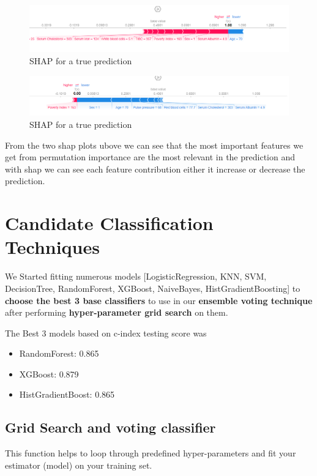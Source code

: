\documentclass[5 pt]{article}
\begin{document}
    \begin{figure}[h]
	\centering
	\includegraphics[width=1\textwidth, height =.15\textheight]{shap.png}
	\caption{SHAP for a true prediction}
	\end{figure}

    \begin{figure}[h]
	\centering
	\includegraphics[width=1\textwidth, height =.15\textheight]{shap2.png}
	\caption{SHAP for a true prediction}
	\end{figure}

From the two shap plots ubove we can see that the most important features we get from permutation importance are the most relevant in the prediction and with shap we can see each feature contribution either it increase or decrease the prediction.


\section{Candidate Classification Techniques}
We Started fitting numerous models [LogisticRegression, KNN, SVM, DecisionTree, RandomForest, XGBoost, NaiveBayes, HistGradientBoosting] to \textbf{choose the best 3 base classifiers} to use in our \textbf{ensemble voting technique} after performing \textbf{hyper-parameter grid search} on them. 


The Best 3 models based on c-index testing score was 
\begin{itemize}
    \item RandomForest: 0.865
    \item XGBoost: 0.879
    \item HistGradientBoost: 0.865
\end{itemize}

\subsection{Grid Search and voting classifier}
This function helps to loop through predefined hyper-parameters and fit your estimator (model) on your training set.\\
\end{document}
